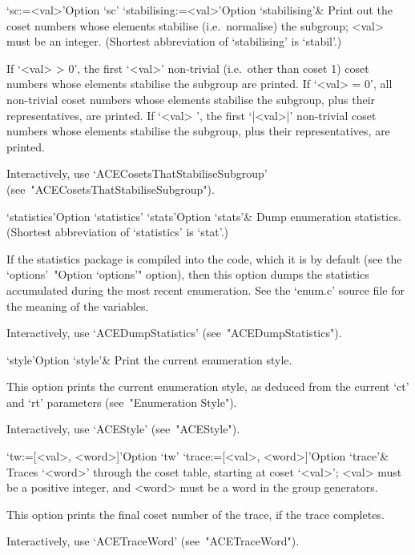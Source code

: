 \>`sc:=<val>'{Option `sc'}
\>`stabilising:=<val>'{Option `stabilising'}&
Print out the coset numbers whose elements stabilise  (i.e.~normalise)
the subgroup; <val> must be an integer.
(Shortest abbreviation of `stabilising' is `stabil'.)

If `<val> > 0', the first `<val>' non-trivial (i.e.~other  than  coset
1) coset numbers whose elements stabilise the subgroup are printed. If
`<val> = 0', all non-trivial coset numbers  whose  elements  stabilise
the subgroup, plus their representatives, are printed.  If  `<val>  ', the first  `|<val>|'  non-trivial  coset  numbers  whose  elements
stabilise the subgroup, plus their representatives, are printed.

Interactively,          use           `ACECosetsThatStabiliseSubgroup'
(see~"ACECosetsThatStabiliseSubgroup").

\>`statistics'{Option `statistics'}
\>`stats'{Option `stats'}&
Dump enumeration statistics.
(Shortest abbreviation of `statistics' is `stat'.)

If the statistics package is compiled into the {\ACE} code,  which  it
is by default (see the `options'~"Option `options'" option), then this
option  dumps  the  statistics  accumulated  during  the  most  recent
enumeration. See the `enum.c' source  file  for  the  meaning  of  the
variables.

Interactively, use `ACEDumpStatistics' (see~"ACEDumpStatistics").

\>`style'{Option `style'}&
Print the current enumeration style.

This option prints the current enumeration style, as deduced from  the
current `ct' and `rt' parameters (see~"Enumeration Style").

Interactively, use `ACEStyle' (see~"ACEStyle").

\>`tw:=[<val>, <word>]'{Option `tw'}
\>`trace:=[<val>, <word>]'{Option `trace'}&
Traces `<word>' through the coset table, starting  at  coset  `<val>';
<val> must be a positive integer, and <word> must be  a  word  in  the
group generators.

This option prints the final coset number of the trace, if  the  trace
completes.

Interactively, use `ACETraceWord' (see~"ACETraceWord").

\enditems


\beginitems

